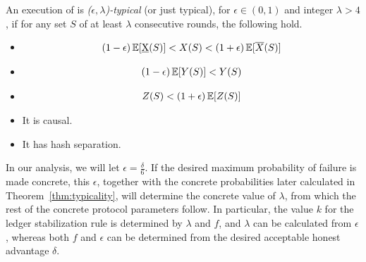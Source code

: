 \begin{definition}\label{def:typicality}
  An execution of \poem is \emph{($\epsilon,\lambda$)-typical} (or just typical),
  for $\epsilon \in (0,1)$ and integer $\lambda > 4$, if for any set $S$ of at
  least $\lambda$ consecutive rounds, the following hold.
  \begin{itemize}
    \item
    \begin{minipage}{\linewidth}%
      \vspace{-\abovedisplayskip}%
      \begin{align}%
        (1 - \epsilon) \E[\underbar{X}(S)] < X(S) < (1 + \epsilon) \E[\overline{X}(S)] \label{eq.typical-x}%
      \end{align}%
    \end{minipage}

    \item
    \begin{minipage}{\linewidth}%
      \vspace{-\abovedisplayskip}%
      \begin{align}%
        (1 - \epsilon) \E[Y(S)] < Y(S) \label{eq.typical-y}%
      \end{align}%
    \end{minipage}

    \item
    \begin{minipage}{\linewidth}%
      \vspace{-\abovedisplayskip}%
      \begin{align}%
        Z(S) < (1 + \epsilon)\E[Z(S)] \label{eq.typical-z}%
      \end{align}%
    \end{minipage}

    \item It is causal.
    \item It has hash separation.
  \end{itemize}
\end{definition}

In our analysis, we will let $\epsilon = \frac{\delta}{6}$. If the desired
maximum probability of failure is made concrete, this $\epsilon$, together
with the concrete probabilities later calculated in Theorem~\ref{thm:typicality},
will determine the concrete value of $\lambda$, from which the rest of the
concrete protocol parameters follow. In particular, the value $k$
for the ledger stabilization rule is
determined by $\lambda$ and $f$, and $\lambda$ can be calculated from $\epsilon$,
whereas both $f$ and $\epsilon$ can be determined from the desired acceptable
honest advantage $\delta$.

